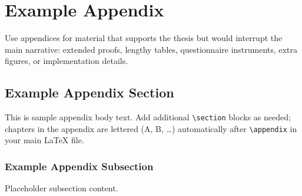 \chapter{Example Appendix}

Use appendices for material that supports the thesis but would interrupt the main
narrative: extended proofs, lengthy tables, questionnaire instruments, extra
figures, or implementation details.

\section{Example Appendix Section}

This is sample appendix body text. Add additional \verb|\section| blocks as needed;
chapters in the appendix are lettered (A, B, \ldots) automatically after
\verb|\appendix| in your main LaTeX file.

\subsection{Example Appendix Subsection}

Placeholder subsection content.
